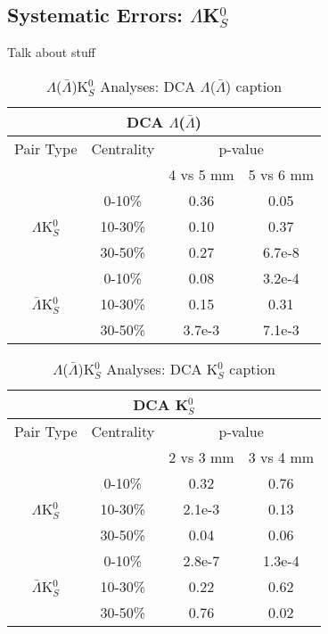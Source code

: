 \documentclass[../AnalysisNoteJBuxton.tex]{subfiles}
\begin{document}
\subsection{Systematic Errors: \texorpdfstring{$\Lambda$K$^{0}_{S}$}{TEXT}}
\label{SysErrsLamK0}

Talk about stuff

\begin{table}
 \centering
 \begin{tabular}{|c|c|c|c|}
  \multicolumn{4}{c}{DCA $\Lambda$($\bar{\Lambda}$)} \\
  \hline
  Pair Type & Centrality & \multicolumn{2}{c|}{p-value} \\
  \cline{3-4}
   & & 4 vs 5 mm & 5 vs 6 mm \\
  \hline
   & 0-10\% & 0.36 & 0.05 \\
  $\Lambda$K$^{0}_{S}$ 
   & 10-30\% & 0.10 & 0.37 \\
   & 30-50\% & 0.27 & 6.7e-8 \\
  \hline
   & 0-10\% & 0.08 & 3.2e-4 \\
  $\bar{\Lambda}$K$^{0}_{S}$ 
   & 10-30\% & 0.15 & 0.31 \\
   & 30-50\% & 3.7e-3 & 7.1e-3 \\
  \hline
 \end{tabular}
 \caption{$\Lambda$($\bar{\Lambda}$)K$^{0}_{S}$ Analyses: DCA $\Lambda$($\bar{\Lambda}$) caption}
 \label{tab:LamDcaLamK0}
\end{table}

\begin{table}
 \centering
 \begin{tabular}{|c|c|c|c|}
  \multicolumn{4}{c}{DCA K$^{0}_{S}$} \\
  \hline
  Pair Type & Centrality & \multicolumn{2}{c|}{p-value} \\
  \cline{3-4}
   & & 2 vs 3 mm & 3 vs 4 mm \\
  \hline
   & 0-10\% & 0.32 & 0.76 \\
  $\Lambda$K$^{0}_{S}$ 
   & 10-30\% & 2.1e-3 & 0.13 \\
   & 30-50\% & 0.04 & 0.06 \\
  \hline
   & 0-10\% & 2.8e-7 & 1.3e-4 \\
  $\bar{\Lambda}$K$^{0}_{S}$ 
   & 10-30\% & 0.22 & 0.62 \\
   & 30-50\% & 0.76 & 0.02 \\
  \hline
 \end{tabular}
 \caption{$\Lambda$($\bar{\Lambda}$)K$^{0}_{S}$ Analyses: DCA K$^{0}_{S}$ caption}
 \label{tab:K0DcaLamK0}
\end{table}
\end{document}
